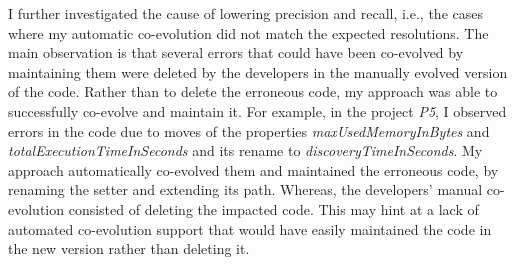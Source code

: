 \begin{table}[t]
	\centering
\caption{Measured precision and recall of my projects.}
\label{table:correctness}
%
\end{table}



I further investigated the cause of lowering precision and recall, i.e., the cases where my automatic co-evolution did not match the expected resolutions. 
The main observation is that several errors that could have been co-evolved by maintaining them were deleted by the developers in the manually evolved version of the code. Rather than to delete the erroneous code, my approach was able to successfully co-evolve and maintain it. 
%
For example, in the project \emph{P5}, I observed errors in the code due to moves of the properties \emph{maxUsedMemoryInBytes} and \emph{totalExecutionTimeInSeconds} and its rename to \emph{discoveryTimeInSeconds}. 
%
My approach automatically co-evolved them and maintained the erroneous code, by renaming the setter and extending its path. Whereas, the developers' manual co-evolution consisted of deleting the impacted code. This may hint at a lack of automated co-evolution support that would have easily maintained the code in the new version rather than deleting it.  

